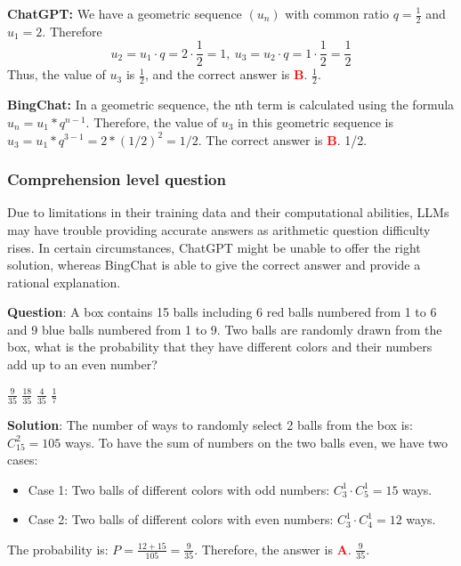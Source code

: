 \documentclass{article}
\begin{document}
{\begin{mdframed}[linewidth=1pt,linecolor=red]
		\textbf{ChatGPT:} We have a geometric sequence $(u_n)$ with common ratio $q=\frac{1}{2}$ and $u_1=2$. Therefore
		$$u_2 = u_1\cdot q = 2\cdot\frac{1}{2} = 1,~
		u_3 = u_2\cdot q = 1\cdot\frac{1}{2} = \frac{1}{2}$$
		Thus, the value of $u_3$ is $\frac{1}{2}$, and the correct answer is \textcolor{red}{\textbf{B}}. $\frac{1}{2}$.
		
		\textbf{BingChat:} In a geometric sequence, the nth term is calculated using the formula $u_n = u_1 * q^{n-1}$. Therefore, the value of $u_3$ in this geometric sequence is $u_3 = u_1 * q^{3-1} = 2 * (1/2)^2 = 1/2$. The correct answer is \textcolor{red}{\textbf{B}}. 1/2.
		
	\end{mdframed}
	
	\subsubsection{Comprehension level question} 
	\label{VNHSGE_Math_C}
	
	Due to limitations in their training data and their computational abilities, LLMs may have trouble providing accurate answers as arithmetic question difficulty rises. In certain circumstances, ChatGPT might be unable to offer the right solution, whereas BingChat is able to give the correct answer and provide a rational explanation.
	
	
	
	\begin{mdframed}[linewidth=1pt,linecolor=red]
		\textbf{Question}: A box contains 15 balls including 6 red balls numbered from 1 to 6 and 9 blue balls numbered from 1 to 9. Two balls are randomly drawn from the box, what is the probability that they have different colors and their numbers add up to an even number?
		
		\begin{oneparchoices}
			\choice $\frac{9}{35}$
			\choice $\frac{18}{35}$
			\choice $\frac{4}{35}$
			\choice $\frac{1}{7}$
		\end{oneparchoices}
		
		\textbf{Solution}:
		The number of ways to randomly select 2 balls from the box is: $C_{15}^{2}=105$ ways.
		To have the sum of numbers on the two balls even, we have two cases:
		\begin{itemize}
			\item Case 1: Two balls of different colors with odd numbers: $C_{3}^{1} \cdot C_{5}^{1}=15$ ways.
			\item Case 2: Two balls of different colors with even numbers: $C_{3}^{1} \cdot C_{4}^{1}=12$ ways.
		\end{itemize}
		The probability is: $P=\frac{12+15}{105}=\frac{9}{35}$.
		Therefore, the answer is \textcolor{red}{\textbf{A}}. $\frac{9}{35}$.
		

\end{mdframed}}
\end{document}
